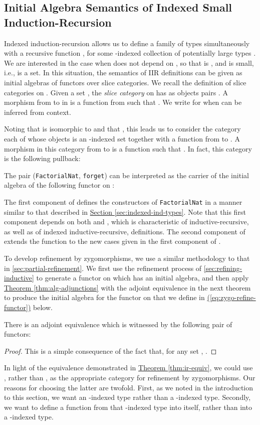 \documentclass{LMCS}
\newcommand{\parenref}[1]{\hyperref[#1]{(\ref*{#1})}}
\newcommand{\thmref}[1]{\hyperref[#1]{Theorem \ref*{#1}}}
\begin{document}
\subsection{Initial Algebra Semantics of Indexed Small
Induction-Recursion}\label{sec:initial-algebra-ir}

Indexed induction-recursion allows us to define a family of types  simultaneously with a recursive function , for some -indexed collection of potentially large types
. We are interested in the case when  does not depend on ,
so that  is , and  is small, i.e.,  is a set. In this
situation, the semantics of IIR definitions can be given as initial
algebras of functors over slice categories. We recall the definition
of slice categories on . Given a set , the {\em slice
  category}  on  has as objects pairs . A morphism from  to  in  is a function
from  such that . We write  for 
when  can be inferred from context.

Noting that  is isomorphic to  and that , this leads us to consider the
category  each of whose objects is an
-indexed set  together with a function from  to
. A morphism in this category from  to  is a
function  such that . In fact, this category is the
following pullback:


The pair (\texttt{FactorialNat}, \texttt{forget}) can be interpreted
as the carrier of the initial algebra of the following functor on
:

The first component of  defines the
constructors of \texttt{FactorialNat} in a manner similar to that
described in \hyperref[sec:indexed-ind-types]{Section
  \ref*{sec:indexed-ind-types}}. Note that this first component
depends on both  and , which is characteristic of
inductive-recursive, as well as of indexed inductive-recursive,
definitions. The second component of 
extends the function  to the new cases given in the first component
of .

To develop refinement by zygomorphisms, we use a similar methodology
to that in \autoref{sec:partial-refinement}. We first use the
refinement process of \autoref{sec:refining-inductive} to generate a
functor on  which has an initial algebra, and then
apply \thmref{thm:alg-adjunctions} with the adjoint equivalence in the
next theorem to produce the initial algebra for the functor on  that we define
in \parenref{eq:zygo-refine-functor} below.

\begin{thm}\label{thm:ir-equiv}
  There is an adjoint equivalence  which is witnessed by the following pair of
  functors:

\end{thm}
\begin{proof}
  This is a simple consequence of the fact that, for any set ,
 .
\end{proof}
\noindent
In light of the equivalence demonstrated in \thmref{thm:ir-equiv}, we
could use , rather than , as the appropriate category for refinement by
zygomorphisms. Our reasons for choosing the latter are twofold. First,
as we noted in the introduction to this section, we want an
-indexed type rather than a -indexed type. Secondly,
we want to define a function from that -indexed type into 
itself, rather than into a -indexed type.
\end{document}
